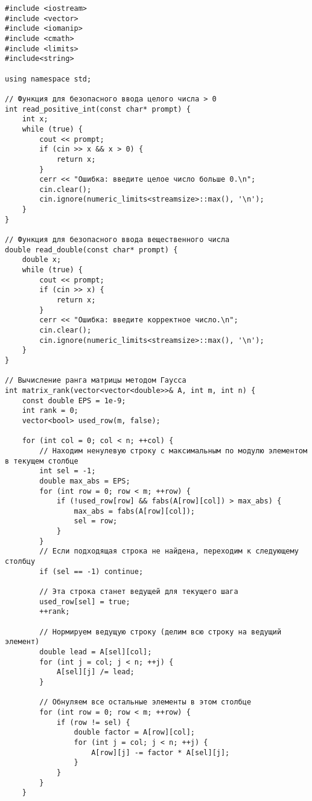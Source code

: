 \documentclass[a4paper,12pt]{article}
\begin{document}
\begin{lstlisting}[style=mystyle, caption=Программа для вычисления ранга матрицы методом Гаусса, label=lst:matrix_rank]
#include <iostream>
#include <vector>
#include <iomanip>
#include <cmath>
#include <limits>
#include<string>

using namespace std;

// Функция для безопасного ввода целого числа > 0
int read_positive_int(const char* prompt) {
    int x;
    while (true) {
        cout << prompt;
        if (cin >> x && x > 0) {
            return x;
        }
        cerr << "Ошибка: введите целое число больше 0.\n";
        cin.clear();
        cin.ignore(numeric_limits<streamsize>::max(), '\n');
    }
}

// Функция для безопасного ввода вещественного числа
double read_double(const char* prompt) {
    double x;
    while (true) {
        cout << prompt;
        if (cin >> x) {
            return x;
        }
        cerr << "Ошибка: введите корректное число.\n";
        cin.clear();
        cin.ignore(numeric_limits<streamsize>::max(), '\n');
    }
}

// Вычисление ранга матрицы методом Гаусса
int matrix_rank(vector<vector<double>>& A, int m, int n) {
    const double EPS = 1e-9;
    int rank = 0;
    vector<bool> used_row(m, false);

    for (int col = 0; col < n; ++col) {
        // Находим ненулевую строку с максимальным по модулю элементом в текущем столбце
        int sel = -1;
        double max_abs = EPS;
        for (int row = 0; row < m; ++row) {
            if (!used_row[row] && fabs(A[row][col]) > max_abs) {
                max_abs = fabs(A[row][col]);
                sel = row;
            }
        }
        // Если подходящая строка не найдена, переходим к следующему столбцу
        if (sel == -1) continue;

        // Эта строка станет ведущей для текущего шага
        used_row[sel] = true;
        ++rank;

        // Нормируем ведущую строку (делим всю строку на ведущий элемент)
        double lead = A[sel][col];
        for (int j = col; j < n; ++j) {
            A[sel][j] /= lead;
        }

        // Обнуляем все остальные элементы в этом столбце
        for (int row = 0; row < m; ++row) {
            if (row != sel) {
                double factor = A[row][col];
                for (int j = col; j < n; ++j) {
                    A[row][j] -= factor * A[sel][j];
                }
            }
        }
    }


\end{lstlisting}
\end{document}
